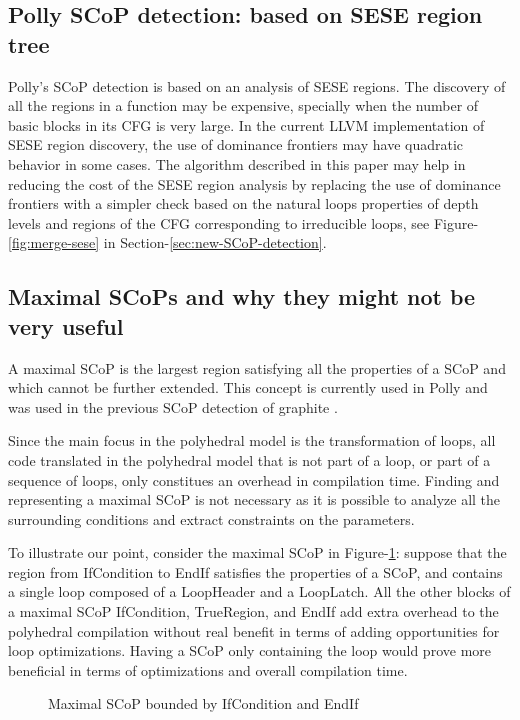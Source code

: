 \documentclass{sigplanconf}
\begin{document}
\subsection{Polly SCoP detection: based on SESE region tree}
\label{subsec:polly-SCoP}
Polly's SCoP detection is based on an analysis of SESE regions.  The discovery
of all the regions in a function may be expensive, specially when the number of
basic blocks in its CFG is very large.  In the current LLVM implementation of
SESE region discovery, the use of dominance frontiers may have quadratic
behavior in some cases.  The algorithm described in this paper may help in
reducing the cost of the SESE region analysis by replacing the use of dominance
frontiers with a simpler check based on the natural loops properties of depth
levels and regions of the CFG corresponding to irreducible loops, see
Figure-\ref{fig:merge-sese} in Section-\ref{sec:new-SCoP-detection}.

\subsection{Maximal SCoPs and why they might not be very useful}
\label{subsec:maximality}
A maximal SCoP is the largest region satisfying all the properties of a SCoP and
which cannot be further extended.  This concept is currently used in Polly
\cite{polly} and was used in the previous SCoP detection of graphite
\cite{graphite}.

Since the main focus in the polyhedral model is the transformation of loops, all
code translated in the polyhedral model that is not part of a loop, or part of a
sequence of loops, only constitues an overhead in compilation time.  Finding and
representing a maximal SCoP is not necessary as it is possible to analyze all
the surrounding conditions and extract constraints on the parameters.

To illustrate our point, consider the maximal SCoP in
Figure-\ref{fig:maximality}: suppose that the region from IfCondition to EndIf
satisfies the properties of a SCoP, and contains a single loop composed of a
LoopHeader and a LoopLatch.  All the other blocks of a maximal SCoP
IfCondition, TrueRegion, and EndIf add extra overhead to the polyhedral
compilation without real benefit in terms of adding opportunities for loop
optimizations.  Having a SCoP only containing the loop would prove more
beneficial in terms of optimizations and overall compilation time.

\begin{figure}
\centering
\caption{Maximal SCoP bounded by IfCondition and EndIf}
\label{fig:maximality}
\end{figure}
\end{document}
